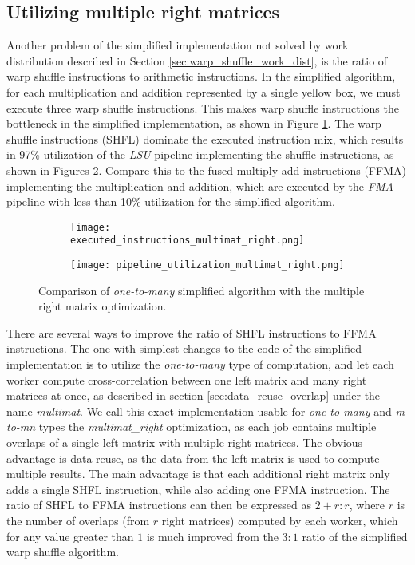 \subsection{Utilizing multiple right matrices}
\label{sec:multimat_right}

Another problem of the simplified implementation not solved by work distribution described in Section \ref{sec:warp_shuffle_work_dist}, is the ratio of warp shuffle instructions to arithmetic instructions. In the simplified algorithm, for each multiplication and addition represented by a single yellow box, we must execute three warp shuffle instructions. This makes warp shuffle instructions the bottleneck in the simplified implementation, as shown in Figure \ref{fig:executed_instructions_multimat_right}. The warp shuffle instructions (SHFL) dominate the executed instruction mix, which results in 97\% utilization of the \textit{LSU} pipeline implementing the shuffle instructions, as shown in Figures \ref{fig:pipeline_utilization_multimat_right}. Compare this to the fused multiply-add instructions (FFMA) implementing the multiplication and addition, which are executed by the \textit{FMA} pipeline with less than 10\% utilization for the simplified algorithm.


\begin{figure}[ht]
	\centering	
	\begin{subfigure}{\textwidth}
		\centering
		\texttt{[image: executed\_instructions\_multimat\_right.png]}
		\label{fig:executed_instructions_multimat_right}
	\end{subfigure}
	\hfill
	\begin{subfigure}{\textwidth}
		\centering
		\texttt{[image: pipeline\_utilization\_multimat\_right.png]}
		\label{fig:pipeline_utilization_multimat_right}
	\end{subfigure}
	
	\caption{Comparison of \textit{one-to-many} simplified algorithm with the multiple right matrix optimization.}
	\label{fig:multimat_right_profiling}
\end{figure}

There are several ways to improve the ratio of SHFL instructions to FFMA instructions. The one with simplest changes to the code of the simplified implementation is to utilize the \textit{one-to-many} type of computation, and let each worker compute cross-correlation between one left matrix and many right matrices at once, as described in section \ref{sec:data_reuse_overlap} under the name \textit{multimat}. We call this exact implementation usable for \textit{one-to-many} and \textit{m-to-mn} types the \textit{multimat\_right} optimization, as each job contains multiple overlaps of a single left matrix with multiple right matrices. The obvious advantage is data reuse, as the data from the left matrix is used to compute multiple results. The main advantage is that each additional right matrix only adds a single SHFL instruction, while also adding one FFMA instruction. The ratio of SHFL to FFMA instructions can then be expressed as $2 + r : r$, where $r$ is the number of overlaps (from $r$ right matrices) computed by each worker, which for any value greater than $1$ is much improved from the $3:1$ ratio of the simplified warp shuffle algorithm.


